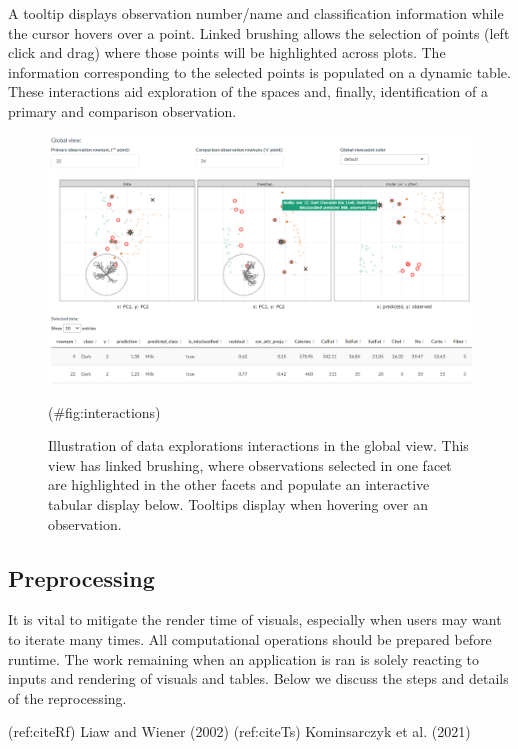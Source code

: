 \documentclass[
]{article}
\begin{document}
A tooltip displays observation number/name and classification
information while the cursor hovers over a point. Linked brushing allows
the selection of points (left click and drag) where those points will be
highlighted across plots. The information corresponding to the selected
points is populated on a dynamic table. These interactions aid
exploration of the spaces and, finally, identification of a primary and
comparison observation.

\begin{figure}

{\centering \includegraphics[width=1\linewidth]{./figures/app_interactions} 

}

\caption{Illustration of data explorations interactions in the global view. This view has linked brushing, where observations selected in one facet are highlighted in the other facets and populate an interactive tabular display below. Tooltips display when hovering over an observation.}(\#fig:interactions)
\end{figure}

\hypertarget{preprocessing}{%
\subsection{Preprocessing}\label{preprocessing}}

It is vital to mitigate the render time of visuals, especially when
users may want to iterate many times. All computational operations
should be prepared before runtime. The work remaining when an
application is ran is solely reacting to inputs and rendering of visuals
and tables. Below we discuss the steps and details of the reprocessing.

(ref:citeRf) Liaw and Wiener (2002) (ref:citeTs) Kominsarczyk et al.
(2021)
\end{document}
